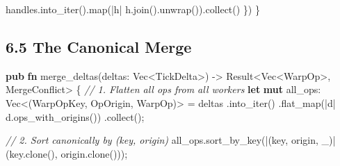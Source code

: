 \documentclass[
  11pt,
]{book}
\newenvironment{Shaded}{}{}
\newcommand{\CommentTok}[1]{\textcolor[rgb]{0.38,0.63,0.69}{\textit{#1}}}
\newcommand{\DataTypeTok}[1]{\textcolor[rgb]{0.56,0.13,0.00}{#1}}
\newcommand{\KeywordTok}[1]{\textcolor[rgb]{0.00,0.44,0.13}{\textbf{#1}}}
\newcommand{\NormalTok}[1]{#1}
\newcommand{\OperatorTok}[1]{\textcolor[rgb]{0.40,0.40,0.40}{#1}}
\begin{document}
\begin{Shaded}
\begin{Highlighting}[]
\NormalTok{        handles}\OperatorTok{.}\NormalTok{into\_iter()}\OperatorTok{.}\NormalTok{map(}\OperatorTok{|}\NormalTok{h}\OperatorTok{|}\NormalTok{ h}\OperatorTok{.}\NormalTok{join()}\OperatorTok{.}\NormalTok{unwrap())}\OperatorTok{.}\NormalTok{collect()}
    \OperatorTok{\}}\NormalTok{)}
\OperatorTok{\}}
\end{Highlighting}
\end{Shaded}

\subsection{6.5 The Canonical Merge}\label{the-canonical-merge}

\begin{Shaded}
\begin{Highlighting}[]
\KeywordTok{pub} \KeywordTok{fn}\NormalTok{ merge\_deltas(deltas}\OperatorTok{:} \DataTypeTok{Vec}\OperatorTok{\textless{}}\NormalTok{TickDelta}\OperatorTok{\textgreater{}}\NormalTok{) }\OperatorTok{{-}\textgreater{}} \DataTypeTok{Result}\OperatorTok{\textless{}}\DataTypeTok{Vec}\OperatorTok{\textless{}}\NormalTok{WarpOp}\OperatorTok{\textgreater{},}\NormalTok{ MergeConflict}\OperatorTok{\textgreater{}} \OperatorTok{\{}
    \CommentTok{// 1. Flatten all ops from all workers}
    \KeywordTok{let} \KeywordTok{mut}\NormalTok{ all\_ops}\OperatorTok{:} \DataTypeTok{Vec}\OperatorTok{\textless{}}\NormalTok{(WarpOpKey}\OperatorTok{,}\NormalTok{ OpOrigin}\OperatorTok{,}\NormalTok{ WarpOp)}\OperatorTok{\textgreater{}} \OperatorTok{=}\NormalTok{ deltas}
        \OperatorTok{.}\NormalTok{into\_iter()}
        \OperatorTok{.}\NormalTok{flat\_map(}\OperatorTok{|}\NormalTok{d}\OperatorTok{|}\NormalTok{ d}\OperatorTok{.}\NormalTok{ops\_with\_origins())}
        \OperatorTok{.}\NormalTok{collect()}\OperatorTok{;}

    \CommentTok{// 2. Sort canonically by (key, origin)}
\NormalTok{    all\_ops}\OperatorTok{.}\NormalTok{sort\_by\_key(}\OperatorTok{|}\NormalTok{(key}\OperatorTok{,}\NormalTok{ origin}\OperatorTok{,}\NormalTok{ \_)}\OperatorTok{|}\NormalTok{ (key}\OperatorTok{.}\NormalTok{clone()}\OperatorTok{,}\NormalTok{ origin}\OperatorTok{.}\NormalTok{clone()))}\OperatorTok{;}


\end{Highlighting}
\end{Shaded}
\end{document}
